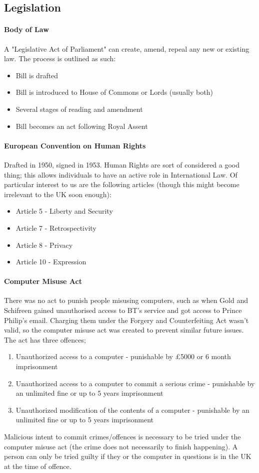 \subsection{Legislation}
\paragraph{Body of Law} A "Legislative Act of Parliament" can create, amend, repeal any new or existing law. The process is outlined as such:
\begin{itemize}
	\item Bill is drafted
	\item Bill is introduced to House of Commons or Lords (usually both)
	\item Several stages of reading and amendment
	\item Bill becomes an act following Royal Assent
\end{itemize}
\paragraph{European Convention on Human Rights} Drafted in 1950, signed in 1953. Human Rights are sort of considered a good thing; this allows individuals to have an active role in International Law. Of particular interest to us are the following articles (though this might become irrelevant to the UK soon enough):
\begin{itemize}
	\item Article 5 - Liberty and Security
	\item Article 7 - Retrospectivity
	\item Article 8 - Privacy
	\item Article 10 - Expression
\end{itemize}
\paragraph{Computer Misuse Act} There was no act to punish people misusing computers, such as when Gold and Schifreen gained unauthorised access to BT's service and got access to Prince Philip's email. Charging them under the Forgery and Counterfeiting Act wasn't valid, so the computer misuse act was created to prevent similar future issues. The act has three offences;
\begin{enumerate}
	\item Unauthorized access to a computer - punishable by £5000 or 6 month imprisonment
	\item Unauthorized access to a computer to commit a serious crime - punishable by an unlimited fine or up to 5 years imprisonment
	\item Unauthorized modification of the contents of a computer - punishable by an unlimited fine or up to 5 years imprisonment
\end{enumerate}
Malicious intent to commit crimes/offences is necessary to be tried under the computer misuse act (the crime does not necessarily to finish happening). A person can only be tried guilty if they or the computer in questions is in the UK at the time of offence.
